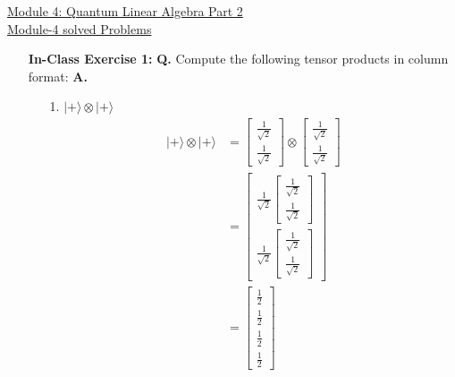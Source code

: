 \documentclass[main.tex]{subfiles}
\begin{document}
\href{https://www2.seas.gwu.edu/~simhaweb/quantum/modules/module4/module4.html}{Module 4: Quantum Linear Algebra Part 2}\\
\href{https://www2.seas.gwu.edu/~simhaweb/quantum/modules/module4/problems3.html}{Module-4 solved Problems}

\begin{enumerate}

\item[] \textbf{In-Class Exercise 1:} \textbf{Q.} Compute the following tensor products in column format: \textbf{A.}
    \begin{enumerate}
        \item[1.] $|+\rangle \otimes |+\rangle$
        \begin{align*}
            |+\rangle \otimes |+\rangle     & = \left[\begin{array}{l}\frac{1}{\sqrt{2}} \\ \frac{1}{\sqrt{2}} \end{array}\right]   
                                            \otimes\left[\begin{array}{l} \frac{1}{\sqrt{2}} \\ \frac{1}{\sqrt{2}}\end{array}\right] \\
                                            & = \left[\begin{array}{l} \frac{1}{\sqrt{2}}
                                            \left[\begin{array}{l} \frac{1}{\sqrt{2}} \\ \frac{1}{\sqrt{2}} \end{array}\right]\\ 
                                            \frac{1}{\sqrt{2}}
                                            \left[\begin{array}{l} \frac{1}{\sqrt{2}} \\ \frac{1}{\sqrt{2}} \end{array}\right]
                                            \end{array}\right] \\
                                            & = \left[\begin{array}{l} \frac{1}{2} \\ \frac{1}{2} \\
                                            \frac{1}{2} \\ \frac{1}{2} \end{array}\right]
        \end{align*}

\end{enumerate}
\end{enumerate}
\end{document}
